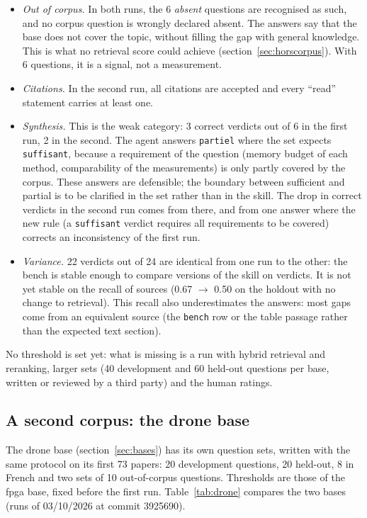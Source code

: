 \documentclass[11pt,a4paper]{article}
\newcommand{\cmd}[1]{\texttt{#1}}
\begin{document}
\begin{itemize}
  \item \emph{Out of corpus.} In both runs, the 6 \emph{absent} questions are recognised as
    such, and no corpus question is wrongly declared absent. The answers say that the base
    does not cover the topic, without filling the gap with general knowledge. This is what
    no retrieval score could achieve (section~\ref{sec:horscorpus}). With 6 questions, it is
    a signal, not a measurement.
  \item \emph{Citations.} In the second run, all citations are accepted and every ``read''
    statement carries at least one.
  \item \emph{Synthesis.} This is the weak category: 3 correct verdicts out of 6 in the first
    run, 2 in the second. The agent answers \cmd{partiel} where the set expects \cmd{suffisant},
    because a requirement of the question (memory budget of each method, comparability of the
    measurements) is only partly covered by the corpus. These answers are defensible; the
    boundary between sufficient and partial is to be clarified in the set rather than in the
    skill. The drop in correct verdicts in the second run comes from there, and from one
    answer where the new rule (a \cmd{suffisant} verdict requires all requirements to be
    covered) corrects an inconsistency of the first run.
  \item \emph{Variance.} 22 verdicts out of 24 are identical from one run to the other: the
    bench is stable enough to compare versions of the skill on verdicts. It is not yet stable
    on the recall of sources (0.67 $\rightarrow$ 0.50 on the holdout with no change to
    retrieval). This recall also underestimates the answers: most gaps come from an
    equivalent source (the \cmd{bench} row or the table passage rather than the expected text
    section).
\end{itemize}
No threshold is set yet: what is missing is a run with hybrid retrieval and reranking,
larger sets (40 development and 60 held-out questions per base, written or reviewed by a
third party) and the human ratings.

\subsection{A second corpus: the drone base}
\label{sec:drone}

The drone base (section~\ref{sec:bases}) has its own question sets, written with the same
protocol on its first 73 papers: 20 development questions, 20 held-out, 8 in French and two
sets of 10 out-of-corpus questions. Thresholds are those of the fpga base, fixed before the
first run. Table~\ref{tab:drone} compares the two bases (runs of 03/10/2026 at commit 3925690).
\end{document}
